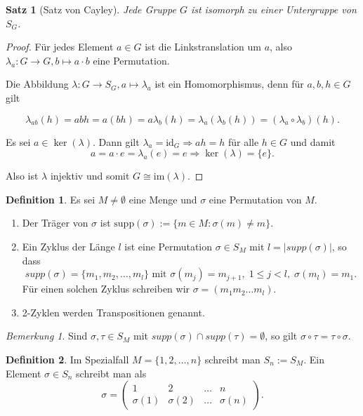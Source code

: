 \documentclass[12pt]{scrartcl}%
\newtheorem{thm}{Satz}
\theoremstyle{definition}
\newtheorem*{defn}{Definition}
\theoremstyle{remark}
\newtheorem*{nb}{Bemerkung}
\begin{document}
\begin{thm}[Satz von Cayley]
    Jede Gruppe $G$ ist isomorph zu einer Untergruppe von $S_G$.
\end{thm}
\begin{proof}

    Für jedes Element $a\in G$ ist die Linkstranslation um $a$, also $\lambda_a:G\to G, b\mapsto a\cdot b$ eine Permutation.

    Die Abbildung $\lambda:G\to S_G, a\mapsto \lambda_a$ ist ein Homomorphismus, denn für $a,b,h\in G$ gilt

\[\lambda_{ab}(h) = abh = a(bh) = a\lambda_b(h) = \lambda_a(\lambda_b(h)) = (\lambda_a\circ\lambda_b)(h).\]

    Es sei $a\in \ker(\lambda)$. Dann gilt $\lambda_a = \text{id}_G \Rightarrow ah = h$ für alle $h\in G $ und damit
    \[a = a\cdot e = \lambda_a(e) = e \Rightarrow \ker(\lambda) = \{e\}.\]
    
    Also ist $\lambda$ injektiv und somit $G\cong\text{im}(\lambda)$.
\end{proof}

\begin{defn}
    Es sei $M\neq\emptyset$ eine Menge und $\sigma$ eine Permutation von $M$.
    \begin{enumerate}
        \item Der Träger von $\sigma$ ist $\text{supp}(\sigma) := \{m\in M: \sigma(m)\neq m\}$.
    
        \item Ein Zyklus der Länge $l$ ist eine Permutation $\sigma\in S_M$ mit $l = |supp(\sigma)|$, so dass
    \[supp(\sigma) = \{m_1,m_2,\dots,m_l\}\text{ mit }\sigma(m_j) = m_{j+1},\; 1\leq j<l,\; \sigma(m_l) = m_1.\]
    Für einen solchen Zyklus schreiben wir $\sigma = (m_1m_2\dots m_l)$.
    
        \item 2-Zyklen werden Transpositionen genannt.
    \end{enumerate}
\end{defn}


\begin{nb}
    Sind $\sigma,\tau\in S_M$ mit $supp(\sigma)\cap supp(\tau) = \emptyset$, so gilt $\sigma\circ\tau = \tau\circ\sigma$.
\end{nb}


\begin{defn}
    Im Spezialfall $M=\{1,2,\dots,n\}$ schreibt man $S_n := S_M$. Ein Element $\sigma\in S_n$ schreibt man als \[\sigma = \begin{pmatrix}
     1 & 2 & \dots & n \\
     \sigma(1) & \sigma(2) & \dots & \sigma(n) \end{pmatrix}.\]
\end{defn}
\end{document}
